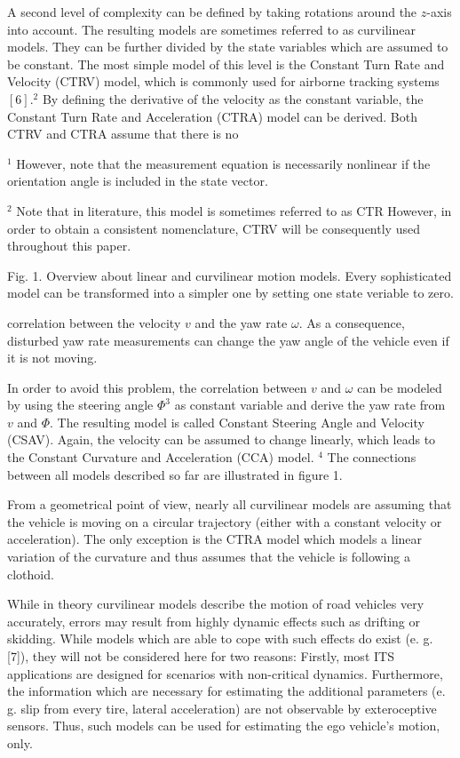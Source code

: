 A second level of complexity can be defined by taking rotations around the $z$-axis into account. The resulting models are sometimes referred to as curvilinear models. They can be further divided by the state variables which are assumed to be constant. The most simple model of this level is the Constant Turn Rate and Velocity (CTRV) model, which is commonly used for airborne tracking systems $[6] .{ }^{2}$ By defining the derivative of the velocity as the constant variable, the Constant Turn Rate and Acceleration (CTRA) model can be derived. Both CTRV and CTRA assume that there is no

${ }^{1}$ However, note that the measurement equation is necessarily nonlinear if the orientation angle is included in the state vector.

${ }^{2}$ Note that in literature, this model is sometimes referred to as CTR However, in order to obtain a consistent nomenclature, CTRV will be consequently used throughout this paper.

Fig. 1. Overview about linear and curvilinear motion models. Every sophisticated model can be transformed into a simpler one by setting one state veriable to zero.

correlation between the velocity $v$ and the yaw rate $\omega$. As a consequence, disturbed yaw rate measurements can change the yaw angle of the vehicle even if it is not moving.

In order to avoid this problem, the correlation between $v$ and $\omega$ can be modeled by using the steering angle $\Phi^{3}$ as constant variable and derive the yaw rate from $v$ and $\Phi$. The resulting model is called Constant Steering Angle and Velocity (CSAV). Again, the velocity can be assumed to change linearly, which leads to the Constant Curvature and Acceleration (CCA) model. ${ }^{4}$ The connections between all models described so far are illustrated in figure 1.

From a geometrical point of view, nearly all curvilinear models are assuming that the vehicle is moving on a circular trajectory (either with a constant velocity or acceleration). The only exception is the CTRA model which models a linear variation of the curvature and thus assumes that the vehicle is following a clothoid.

While in theory curvilinear models describe the motion of road vehicles very accurately, errors may result from highly dynamic effects such as drifting or skidding. While models which are able to cope with such effects do exist (e. g. [7]), they will not be considered here for two reasons: Firstly, most ITS applications are designed for scenarios with non-critical dynamics. Furthermore, the information which are necessary for estimating the additional parameters (e. g. slip from every tire, lateral acceleration) are not observable by exteroceptive sensors. Thus, such models can be used for estimating the ego vehicle's motion, only.

